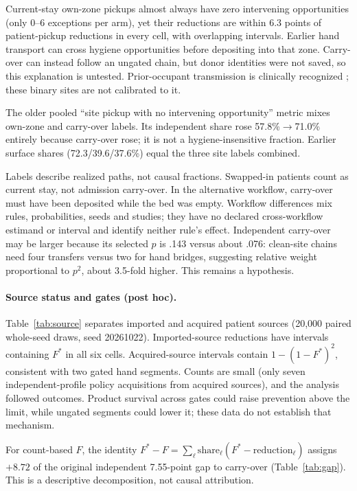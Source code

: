 \documentclass[11pt]{article}
\begin{document}
Current-stay own-zone pickups almost always have zero intervening opportunities
(only 0--6 exceptions per arm), yet their reductions are within 6.3 points of
patient-pickup reductions in every cell, with overlapping intervals. Earlier
hand transport can cross hygiene opportunities before depositing into that zone.
Carry-over can instead follow an ungated chain, but donor identities were not
saved, so this explanation is untested. Prior-occupant transmission is clinically
recognized \citep{mitchell2015}; these binary sites are not calibrated to it.

The older pooled ``site pickup with no intervening opportunity'' metric mixes
own-zone and carry-over labels. Its independent share rose 57.8\%$\to$71.0\%
entirely because carry-over rose; it is not a hygiene-insensitive fraction.
Earlier surface shares (72.3/39.6/37.6\%) equal the three site labels combined.

Labels describe realized paths, not causal fractions. Swapped-in patients count
as current stay, not admission carry-over. In the alternative workflow,
carry-over must have been deposited while the bed was empty. Workflow differences
mix rules, probabilities, seeds and studies; they have no declared cross-workflow
estimand or interval and identify neither rule's effect. Independent carry-over
may be larger because its selected $p$ is .143 versus about .076: clean-site
chains need four transfers versus two for hand bridges, suggesting relative
weight proportional to $p^2$, about 3.5-fold higher. This remains a hypothesis.

\paragraph{Source status and gates (post hoc).}
Table~\ref{tab:source} separates imported and acquired patient sources
(20,000 paired whole-seed draws, seed 20261022). Imported-source reductions
have intervals containing $F^*$ in all six cells. Acquired-source intervals
contain $1-(1-F^*)^2$, consistent with two gated hand segments. Counts are small
(only seven independent-profile policy acquisitions from acquired sources),
and the analysis followed outcomes. Product survival across gates could raise
prevention above the limit, while ungated segments could lower it; these data
do not establish that mechanism.

For count-based $F$, the identity
$F^*-F=\sum_\ell\mathrm{share}_\ell(F^*-\mathrm{reduction}_\ell)$
assigns $+8.72$ of the original independent 7.55-point gap to carry-over
(Table~\ref{tab:gap}). This is a descriptive decomposition, not causal attribution.
\end{document}
